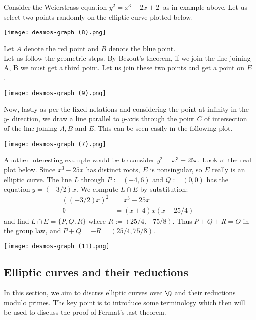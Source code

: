     


\begin{example}
Consider the Weierstrass equation $y^2=x^3-2x+2$, as in example above. Let us select two points  randomly on the elliptic curve plotted below.
    \begin{center}
        \texttt{[image: desmos-graph (8).png]}
    \end{center}
Let $A$ denote the red point and $B$ denote the blue point. \\
    Let us follow the geometric steps. By Bezout's theorem, if we join the line joining A, B we must get a third point. Let us join these two points and get a point on $E$.
\begin{center}
        \texttt{[image: desmos-graph (9).png]}
    \end{center}
    Now, lastly as per the fixed notations and considering the point at infinity in the $y$- direction, we draw a line parallel to $y$-axis through the point $C$ of intersection of the line joining $A,B$ and $E$.
    This can be seen easily in the following plot.
\begin{center}
        \texttt{[image: desmos-graph (7).png]}
    \end{center}
Another interesting example would be to consider $y^2=x^3-25x$. Look at the real plot below. Since $x^3-25 x$ has distinct roots, $E$ is nonsingular, so $E$ really is an elliptic curve. The line $L$ through $P:=(-4,6)$ and $Q:=(0,0)$ has the equation $y=(-3 / 2) x$. We compute $L \cap E$ by substitution:
$$
\begin{aligned}
((-3 / 2) x)^2 & =x^3-25 x \\
0 & =(x+4) x(x-25 / 4)
\end{aligned}
$$
and find $L \cap E=\{P, Q, R\}$ where $R:=(25 / 4,-75 / 8)$. Thus $P+Q+R=O$ in the group law, and $P+Q=-R=(25 / 4,75 / 8)$.
\begin{center}
        \texttt{[image: desmos-graph (11).png]}
    \end{center}

\end{example}
\subsection{Elliptic curves and their reductions}
In this section, we aim to discuss elliptic curves over $\Q$ and their reductions modulo primes. The key point is to introduce some terminology which then will be used to discuss the proof of Fermat's last theorem. 


